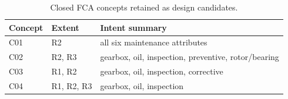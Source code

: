 \begin{table}[tbp]
\centering
\caption{Closed FCA concepts retained as design candidates.}
\label{tab:concepts}
\scriptsize
\begin{tabular}{lll}
\toprule
Concept & Extent & Intent summary\\
\midrule
C01 & R2 & all six maintenance attributes\\
C02 & R2, R3 & gearbox, oil, inspection, preventive, rotor/bearing\\
C03 & R1, R2 & gearbox, oil, inspection, corrective\\
C04 & R1, R2, R3 & gearbox, oil, inspection\\
\bottomrule
\end{tabular}
\end{table}
